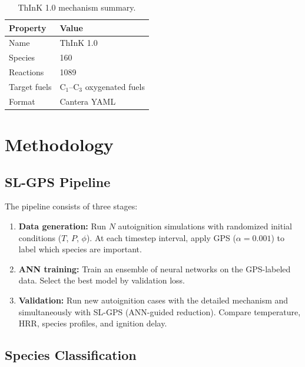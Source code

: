 \documentclass[11pt,a4paper]{article}
\begin{document}
\begin{table}[H]
\centering
\caption{ThInK 1.0 mechanism summary.}
\label{tab:mech}
\begin{tabular}{ll}
\toprule
\textbf{Property} & \textbf{Value} \\
\midrule
Name & ThInK 1.0 \\
Species & 160 \\
Reactions & 1089 \\
Target fuels & C$_1$--C$_3$ oxygenated fuels \\
Format & Cantera YAML \\
\bottomrule
\end{tabular}
\end{table}

\section{Methodology}
\label{sec:methodology}

\subsection{SL-GPS Pipeline}

The pipeline consists of three stages:
\begin{enumerate}
    \item \textbf{Data generation:} Run $N$ autoignition simulations with randomized initial conditions ($T$, $P$, $\phi$). At each timestep interval, apply GPS ($\alpha = 0.001$) to label which species are important.
    \item \textbf{ANN training:} Train an ensemble of neural networks on the GPS-labeled data. Select the best model by validation loss.
    \item \textbf{Validation:} Run new autoignition cases with the detailed mechanism and simultaneously with SL-GPS (ANN-guided reduction). Compare temperature, HRR, species profiles, and ignition delay.
\end{enumerate}

\subsection{Species Classification}
\end{document}

